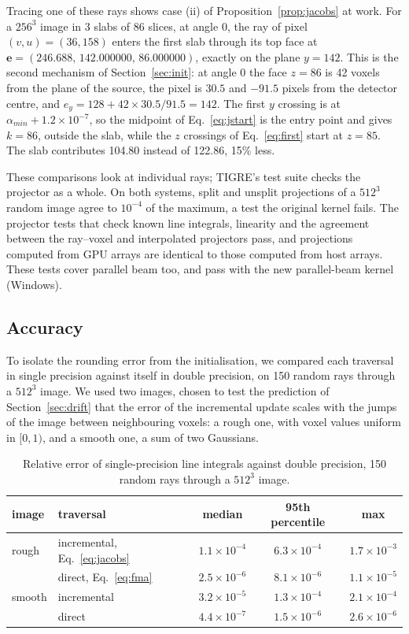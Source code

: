 \documentclass[11pt,a4paper]{article}
\theoremstyle{remark}
\newcommand{\e}{\mathbf{e}}
\begin{document}
Tracing one of these rays shows case (ii) of Proposition~\ref{prop:jacobs} at work. For a $256^3$ image in
3 slabs of 86 slices, at angle 0, the ray of pixel $(v,u)=(36,158)$ enters the first slab through its top
face at $\e=(246.688,\,142.000000,\,86.000000)$, exactly on the plane $y=142$. This is the second mechanism
of Section~\ref{sec:init}: at angle 0 the face $z=86$ is 42 voxels from the plane of the source, the pixel is
$30.5$ and $-91.5$ pixels from the detector centre, and $e_y=128+42\times30.5/91.5=142$. The first $y$ crossing is at
$\alpha_{min}+1.2\times10^{-7}$, so the midpoint of Eq.~\eqref{eq:jstart} is the entry point and gives
$k=86$, outside the slab, while the $z$ crossings of Eq.~\eqref{eq:first} start at $z=85$. The slab
contributes 104.80 instead of 122.86, 15\% less.

These comparisons look at individual rays; TIGRE's test suite checks the projector as a whole. On both
systems, split and unsplit projections of a $512^3$ random image agree to $10^{-4}$ of the maximum, a test
the original kernel fails. The projector tests that check known line integrals, linearity and the agreement
between the ray--voxel and interpolated projectors pass, and projections computed from GPU arrays are
identical to those computed from host arrays. These tests cover parallel beam too, and pass with the new
parallel-beam kernel (Windows).

\subsection{Accuracy}

To isolate the rounding error from the initialisation, we compared each traversal in single precision
against itself in double precision, on 150 random rays through a $512^3$ image. We used two images, chosen
to test the prediction of Section~\ref{sec:drift} that the error of the incremental update scales with the
jumps of the image between neighbouring voxels: a rough one, with voxel values uniform in $[0,1)$, and a
smooth one, a sum of two Gaussians.

\begin{table}[h]
\centering
\caption{\label{tab:acc}Relative error of single-precision line integrals against double precision,
150 random rays through a $512^3$ image.}
\begin{tabular}{llccc}
\toprule
image & traversal & median & 95th percentile & max\\
\midrule
rough & incremental, Eq.~\eqref{eq:jacobs} & $1.1\times10^{-4}$ & $6.3\times10^{-4}$ & $1.7\times10^{-3}$\\
      & direct, Eq.~\eqref{eq:fma}        & $2.5\times10^{-6}$ & $8.1\times10^{-6}$ & $1.1\times10^{-5}$\\
\midrule
smooth & incremental & $3.2\times10^{-5}$ & $1.3\times10^{-4}$ & $2.1\times10^{-4}$\\
       & direct      & $4.4\times10^{-7}$ & $1.5\times10^{-6}$ & $2.6\times10^{-6}$\\
\bottomrule
\end{tabular}
\end{table}
\end{document}

